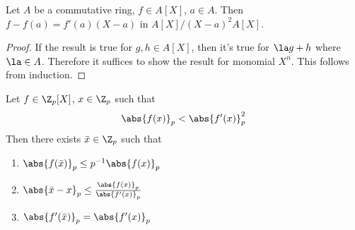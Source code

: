 \begin{prop}
  Let $A$ be a commutative ring, $f \in A[X]$, $a \in A$. 
  Then $f - f(a) = f'(a)(X - a)$ in $A[X]/(X-a)^2A[X]$. 
\end{prop}
\begin{proof}
  If the result is true for $g, h \in A[X]$,
  then it's true for $\la g + h$ where $\la \in A$. 
  Therefore it suffices to show the result for monomial $X^n$. 
  This follows from induction. 
\end{proof}

\begin{prop}
  
  Let $f \in \Z_p[X]$, $x \in \Z_p$ such that 
  \[
    \abs{f(x)}_p < \abs{f'(x)}_p^2
  \]
  Then there exists $\bar{x} \in \Z_p$ such that 
  \begin{enumerate}
    \item $\abs{f(\bar{x})}_p \leq p^{-1}\abs{f(x)}_p$
    \item $\abs{\bar{x} - x}_p \leq \frac{\abs{f(x)}_p}{\abs{f'(x)}_p}$
    \item $\abs{f'(\bar{x})}_p = \abs{f'(x)}_p$
  \end{enumerate}
\end{prop}
